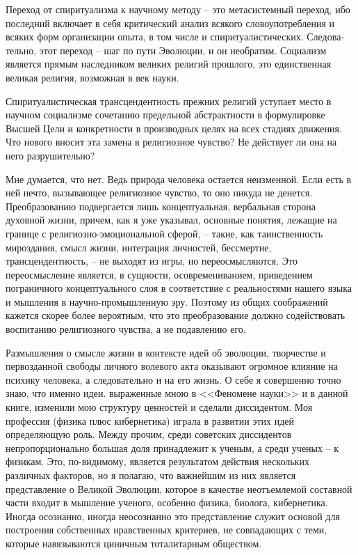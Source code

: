 \documentclass{book}
\begin{document}
Переход от спиритуализма к научному методу -- это метасистемный переход, ибо последний включает в себя критиче­ский анализ всякого словоупотребления и всяких форм орга­низации опыта, в том числе и спиритуалистических. Следова­тельно, этот переход -- шаг по пути Эволюции, и он необратим. Социализм является прямым наследником великих религий прошлого, это единственная великая религия, возможная в век науки.

Спиритуалистическая трансцендентность прежних религий ус­тупает место в научном социализме сочетанию предельной аб­страктности в формулировке Высшей Цели и конкретности в производных целях на всех стадиях движения. Что нового вносит эта замена в религиозное чувство? Не действует ли она на него разрушительно?

Мне думается, что нет. Ведь природа человека остается неиз­менной. Если есть в ней нечто, вызывающее религиозное чувст­во, то оно никуда не денется. Преобразованию подвергается лишь концептуальная, вербальная сторона духовной жизни, причем, как я уже указывал, основные понятия, лежащие на границе с религиозно-эмоциональной сферой, -- такие, как таинст­венность мироздания, смысл жизни, интеграция личностей, бес­смертие, трансцендентность, -- не выходят из игры, но перео­смысляются.  Это переосмысление является, в сущности, осовремениванием, приведением пограничного концептуального слоя в соответствие с реальностями нашего языка и мышления в научно-промышленную эру. Поэтому из общих соображений кажется скорее более вероятным, что это преобразование должно содействовать воспитанию религиозного чувства, а не подавлению его.

Размышления о смысле жизни в контексте идей об эволюции, творчестве и первозданной свободы личного волевого акта оказывают огромное влияние на психику человека, а следо­вательно и на его жизнь. О себе я совершенно точно знаю, что именно идеи. выраженные мною в <<Феномене науки>> и в данной книге, изменили мою структуру ценностей и сделали диссиден­том. Моя профессия (физика плюс кибернетика) играла в раз­витии этих идей определяющую роль. Между прочим, среди советских диссидентов непропорционально большая доля при­надлежит к ученым, а среди ученых -- к физикам. Это, по-видимому, является результатом действия нескольких различных факторов, но я полагаю, что важнейшим из них является представление о Великой Эволюции, которое в качестве неотъемлемой составной части входит в мышление ученого, особенно физика, биолога, кибернетика. Иногда осознанно, иногда неосоз­нанно это представление служит основой для построения собственных нравственных критериев, не совпадающих с теми, которые навязываются циничным 
тоталитарным обществом.
\end{document}
